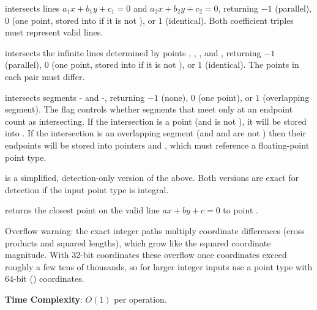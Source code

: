 \begin{compactitem}
  \item {} intersects lines $a_1 x + b_1 y + c_1 = 0$ and $a_2 x + b_2 y + c_2 = 0$, returning $-1$ (parallel), $0$ (one point, stored into  if it is not ), or $1$ (identical). Both coefficient triples must represent valid lines.
  \item {} intersects the infinite lines determined by points , , , and , returning $-1$ (parallel), $0$ (one point, stored into  if it is not ), or $1$ (identical). The points in each pair must differ.
  \item {} intersects segments - and -, returning $-1$ (none), $0$ (one point), or $1$ (overlapping segment). The  flag controls whether segments that meet only at an endpoint count as intersecting. If the intersection is a point (and  is not ), it will be stored into . If the intersection is an overlapping segment (and  and  are not ) then their endpoints will be stored into pointers  and , which must reference a floating-point point type.
  \item {} is a simplified, detection-only version of the above. Both versions are exact for detection if the input point type is integral.
  \item {} returns the closest point on the valid line $ax + by + c = 0$ to point .
\end{compactitem}

Overflow warning: the exact integer paths multiply coordinate differences (cross products and squared lengths), which grow like the squared coordinate magnitude. With 32-bit  coordinates these overflow once coordinates exceed roughly a few tens of thousands, so for larger integer inputs use a point type with 64-bit () coordinates.

\textbf{Time Complexity}: $O(1)$ per operation.

